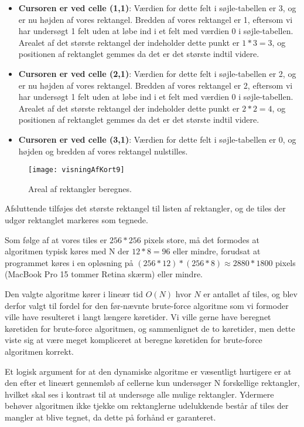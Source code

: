 \begin{itemize}
	\item \textbf{Cursoren er ved celle (1,1)}: Værdien for dette felt i søjle-tabellen er 3, og er nu højden af vores rektangel. Bredden af vores rektangel er 1, eftersom vi har undersøgt 1 felt uden at løbe ind i et felt med værdien 0 i søjle-tabellen. Arealet af det største rektangel der indeholder dette punkt er $1 * 3 = 3$, og positionen af rektanglet gemmes da det er det største indtil videre.
	\item \textbf{Cursoren er ved celle (2,1)}: Værdien for dette felt i søjle-tabellen er 2, og er nu højden af vores rektangel. Bredden af vores rektangel er 2, eftersom vi har undersøgt 1 felt uden at løbe ind i et felt med værdien 0 i søjle-tabellen. Arealet af det største rektangel der indeholder dette punkt er $2 * 2 = 4$, og positionen af rektanglet gemmes da det er det største indtil videre.
	\item \textbf{Cursoren er ved celle (3,1)}: Værdien for dette felt i søjle-tabellen er 0, og højden og bredden af vores rektangel nulstilles.
\end{itemize}

\begin{figure}[h]
	\centering
	\texttt{[image: visningAfKort9]}
	\captionsetup{width=0.8\textwidth}
	\caption{Areal af rektangler beregnes.}
	\label{figur:visningAfKort9}
\end{figure}

Afsluttende tilføjes det største rektangel til listen af rektangler, og de tiles der udgør rektanglet markeres som tegnede.

Som følge af at vores tiles er $256 * 256$ pixels store, må det formodes at algoritmen typisk køres med N der $12*8 = 96$ eller mindre, forudsat at programmet køres i en opløsning på $(256*12) * (256*8) \approx 2880 * 1800$ pixels (MacBook Pro 15 tommer Retina skærm) eller mindre.

Den valgte algoritme kører i lineær tid $O(N)$ hvor $N$ er antallet af tiles, og blev derfor valgt til fordel for den før-nævnte brute-force algoritme som vi formoder ville have resulteret i langt længere køretider. Vi ville gerne have beregnet køretiden for brute-force algoritmen, og sammenlignet de to køretider, men dette viste sig at være meget kompliceret at beregne køretiden for brute-force algoritmen korrekt.

Et logisk argument for at den dynamiske algoritme er væsentligt hurtigere er at den efter et lineært gennemløb af cellerne kun undersøger N forskellige rektangler, hvilket skal ses i kontrast til at undersøge alle mulige rektangler. Ydermere behøver algoritmen ikke tjekke om rektanglerne udelukkende består af tiles der mangler at blive tegnet, da dette på forhånd er garanteret.

